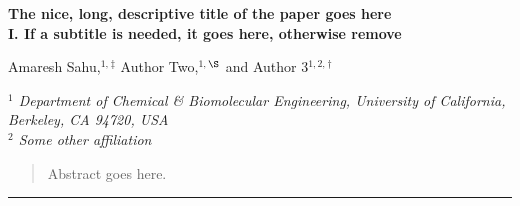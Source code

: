\documentclass[11pt,twoside,notitlepage]{article}
\begin{document}

	\begin{center}
		{\textbf{
			\Large{The nice, long, descriptive title of the paper goes here}
		}} \\
		\vspace{0.11in}
		{\textbf{
			\large{I. If a subtitle is needed, it goes here, otherwise remove}
		}} \\
		\vspace{0.21in}

		{\small
			Amaresh Sahu,$^{1,}$\hyperlink{email1}{$^{\ddag}$}
			Author Two,$^{1,}$\hyperlink{email2}{$^{\S}$}
			and Author 3$^{1,2,}$\hyperlink{email3}{$^{\dag}$} \\
		}
		\vspace{0.25in}

		\footnotesize{
			{
				\textit{$^1$
				Department of Chemical \& Biomolecular Engineering,
				University of California, Berkeley, CA 94720, USA}
				\\[3pt]
				\textit{$^2$
				Some other affiliation}
				\\
			}
		}
	\end{center}



	\vspace{13pt}

	\begin{abstract}
		Abstract goes here.
		\lipsum[1]
	\end{abstract}
	\vspace{15pt}
				   



	\noindent\rule{4.6cm}{0.4pt}

	\small



	\vspace{25pt}
\end{document}
